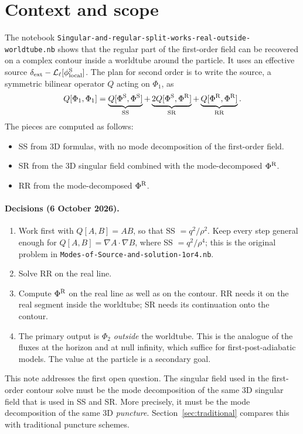 \documentclass[11pt,a4paper]{article}
\newcommand{\dext}{\delta_{\rm ext}}
\newcommand{\Lop}{\mathcal{L}_\ell}
\newcommand{\PhiS}{\Phi^{\rm S}}
\newcommand{\PhiR}{\Phi^{\rm R}}
\newcommand{\phiS}{\phi^{\rm S}}
\newcommand{\nb}[1]{\nolinkurl{#1}}
\begin{document}
\section{Context and scope}

The notebook \nb{Singular-and-regular-split-works-real-outside-worldtube.nb} shows that the regular part of the first-order field can be recovered on a complex contour inside a worldtube around the particle.
It uses an effective source $\dext-\Lop[\phiS_{\rm local}]$.
The plan for second order is to write the source, a symmetric bilinear operator $Q$ acting on $\Phi_1$, as
\begin{equation}
Q[\Phi_1,\Phi_1]=\underbrace{Q[\PhiS,\PhiS]}_{\rm SS}+\underbrace{2Q[\PhiS,\PhiR]}_{\rm SR}+\underbrace{Q[\PhiR,\PhiR]}_{\rm RR}.
\label{eq:split}
\end{equation}
The pieces are computed as follows:
\begin{itemize}[nosep]
\item SS from 3D formulas, with no mode decomposition of the first-order field.
\item SR from the 3D singular field combined with the mode-decomposed $\PhiR$.
\item RR from the mode-decomposed $\PhiR$.
\end{itemize}

\paragraph{Decisions (6 October 2026).}
\begin{enumerate}[nosep]
\item Work first with $Q[A,B]=AB$, so that SS $=q^2/\rho^2$.
  Keep every step general enough for $Q[A,B]=\nabla A\cdot\nabla B$, where SS $=q^2/\rho^4$; this is the original problem in \nb{Modes-of-Source-and-solution-1or4.nb}.
\item Solve RR on the real line.
\item Compute $\PhiR$ on the real line as well as on the contour.
  RR needs it on the real segment inside the worldtube; SR needs its continuation onto the contour.
\item The primary output is $\Phi_2$ \emph{outside} the worldtube.
  This is the analogue of the fluxes at the horizon and at null infinity, which suffice for first-post-adiabatic models.
  The value at the particle is a secondary goal.
\end{enumerate}

This note addresses the first open question.
The singular field used in the first-order contour solve must be the mode decomposition of the same 3D singular field that is used in SS and SR.
More precisely, it must be the mode decomposition of the same 3D \emph{puncture}.
Section~\ref{sec:traditional} compares this with traditional puncture schemes.
\end{document}
